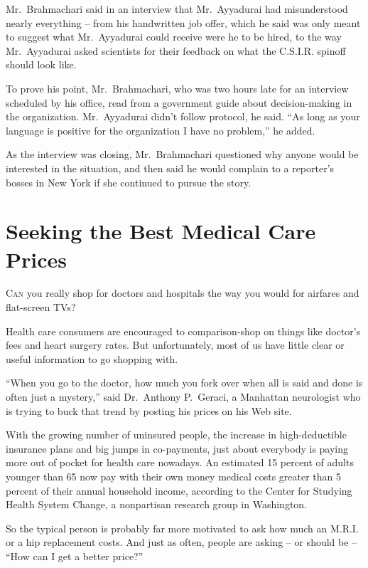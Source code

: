 ﻿\documentclass[12pt]{article}
\begin{document}
Mr.~Brahmachari said in an interview that Mr.~Ayyadurai had misunderstood nearly everything -- from
his handwritten job offer, which he said was only meant to suggest what Mr.~Ayyadurai could receive
were he to be hired, to the way Mr.~Ayyadurai asked scientists for their feedback on what the
C.S.I.R. spinoff should look like.

To prove his point, Mr.~Brahmachari, who was two hours late for an interview scheduled by his
office, read from a government guide about decision-making in the organization. Mr.~Ayyadurai didn't
follow protocol, he said. ``As long as your language is positive for the organization I have no
problem,'' he added.

As the interview was closing, Mr.~Brahmachari questioned why anyone would be interested in the
situation, and then said he would complain to a reporter's bosses in New York if she continued to
pursue the story.

\section{Seeking the Best Medical Care Prices}

\lettrine{C}{an} you really shop for doctors and hospitals the way you would
for airfares and flat-screen TVs?

Health care consumers are encouraged to comparison-shop on things like doctor's fees and heart
surgery rates. But unfortunately, most of us have little clear or useful information to go shopping
with.

``When you go to the doctor, how much you fork over when all is said and done is often just a
mystery,'' said Dr.~Anthony P.~Geraci, a Manhattan neurologist who is trying to buck that trend by
posting his prices on his Web site.

With the growing number of uninsured people, the increase in high-deductible insurance plans and big
jumps in co-payments, just about everybody is paying more out of pocket for health care nowadays. An
estimated 15 percent of adults younger than 65 now pay with their own money medical costs greater
than 5 percent of their annual household income, according to the Center for Studying Health System
Change, a nonpartisan research group in Washington.

So the typical person is probably far more motivated to ask how much an M.R.I. or a hip replacement
costs. And just as often, people are asking -- or should be -- ``How can I get a better price?''
\end{document}

